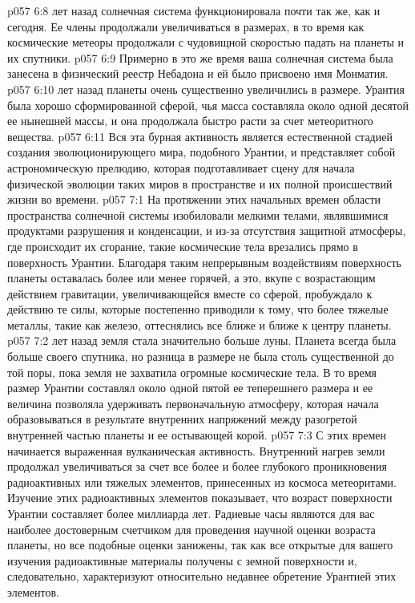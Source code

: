 \vs p057 6:8 \pc {} лет назад солнечная система функционировала почти так же, как и сегодня. Ее члены продолжали увеличиваться в размерах, в то время как космические метеоры продолжали с чудовищной скоростью падать на планеты и их спутники.
\vs p057 6:9 Примерно в это же время ваша солнечная система была занесена в физический реестр Небадона и ей было присвоено имя Монматия.
\vs p057 6:10 \pc {} лет назад планеты очень существенно увеличились в размере. Урантия была хорошо сформированной сферой, чья масса составляла около одной десятой ее нынешней массы, и она продолжала быстро расти за счет метеоритного вещества.
\vs p057 6:11 Вся эта бурная активность является естественной стадией создания эволюционирующего мира, подобного Урантии, и представляет собой астрономическую прелюдию, которая подготавливает сцену для начала физической эволюции таких миров в пространстве и их полной происшествий жизни во времени.
\vs p057 7:1 На протяжении этих начальных времен области пространства солнечной системы изобиловали мелкими телами, являвшимися продуктами разрушения и конденсации, и из\hyp{}за отсутствия защитной атмосферы, где происходит их сгорание, такие космические тела врезались прямо в поверхность Урантии. Благодаря таким непрерывным воздействиям поверхность планеты оставалась более или менее горячей, а это, вкупе с возрастающим действием гравитации, увеличивающейся вместе со сферой, пробуждало к действию те силы, которые постепенно приводили к тому, что более тяжелые металлы, такие как железо, оттеснялись все ближе и ближе к центру планеты.
\vs p057 7:2 \pc {} лет назад земля стала значительно больше луны. Планета всегда была больше своего спутника, но разница в размере не была столь существенной до той поры, пока земля не захватила огромные космические тела. В то время размер Урантии составлял около одной пятой ее теперешнего размера и ее величина позволяла удерживать первоначальную атмосферу, которая начала образовываться в результате внутренних напряжений между разогретой внутренней частью планеты и ее остывающей корой.
\vs p057 7:3 С этих времен начинается выраженная вулканическая активность. Внутренний нагрев земли продолжал увеличиваться за счет все более и более глубокого проникновения радиоактивных или тяжелых элементов, принесенных из космоса метеоритами. Изучение этих радиоактивных элементов показывает, что возраст поверхности Урантии составляет более миллиарда лет. Радиевые часы являются для вас наиболее достоверным счетчиком для проведения научной оценки возраста планеты, но все подобные оценки занижены, так как все открытые для вашего изучения радиоактивные материалы получены с земной поверхности и, следовательно, характеризуют относительно недавнее обретение Урантией этих элементов.
